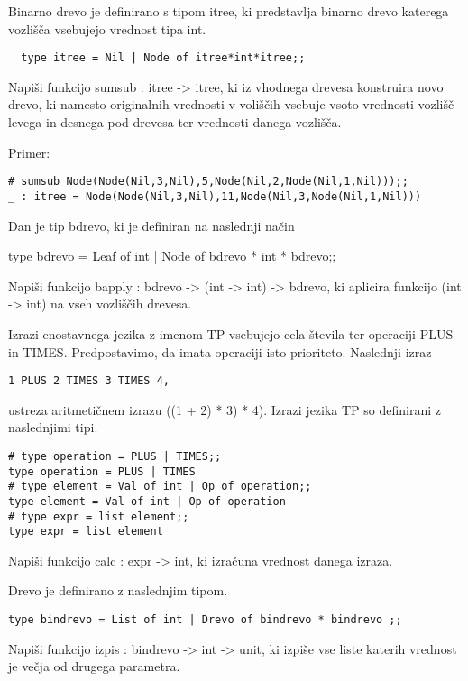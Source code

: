 \begin{ex}
  Binarno drevo je definirano s tipom itree, ki predstavlja binarno
  drevo katerega vozli\v s\v ca vsebujejo vrednost tipa int.
\begin{lstlisting}
  type itree = Nil | Node of itree*int*itree;;
\end{lstlisting}

  Napi\v si funkcijo sumsub : itree -> itree, ki iz vhodnega drevesa
  konstruira novo drevo, ki namesto originalnih vrednosti v voli\v s\v
  cih vsebuje vsoto vrednosti vozli\v s\v c levega in desnega
  pod-drevesa ter vrednosti danega vozli\v s\v ca.

\noindent\/Primer:
\begin{lstlisting}
# sumsub Node(Node(Nil,3,Nil),5,Node(Nil,2,Node(Nil,1,Nil)));;
_ : itree = Node(Node(Nil,3,Nil),11,Node(Nil,3,Node(Nil,1,Nil)))
\end{lstlisting}


\end{ex} 
\begin{ex}
Dan je tip bdrevo, ki je definiran na naslednji na\v cin

type bdrevo = Leaf of int | Node of bdrevo * int * bdrevo;;

Napi\v si funkcijo bapply : bdrevo -> (int -> int) -> bdrevo, ki aplicira funkcijo (int -> int) na vseh vozli\v s\v cih drevesa.  


\end{ex} 
\begin{ex}
Izrazi enostavnega jezika z imenom TP vsebujejo cela \v stevila ter operaciji PLUS in TIMES. Predpostavimo, da imata operaciji isto prioriteto. Naslednji izraz
\begin{lstlisting}
1 PLUS 2 TIMES 3 TIMES 4,
\end{lstlisting}
ustreza aritmeti\v cnem izrazu ((1 + 2) * 3) * 4). Izrazi jezika TP so definirani z naslednjimi tipi. 
 
\begin{lstlisting}
# type operation = PLUS | TIMES;; 
type operation = PLUS | TIMES 
# type element = Val of int | Op of operation;; 
type element = Val of int | Op of operation
# type expr = list element;;
type expr = list element

\end{lstlisting}
Napi\v si funkcijo calc : expr -> int, ki izra\v cuna vrednost danega izraza.  


\end{ex} 
\begin{ex}
Drevo je definirano z naslednjim tipom. 

\begin{lstlisting}
type bindrevo = List of int | Drevo of bindrevo * bindrevo ;; 
\end{lstlisting}

Napi\v si funkcijo izpis : bindrevo -> int -> unit, ki izpi\v se vse liste katerih vrednost je ve\v cja od drugega parametra. 


\end{ex} 
